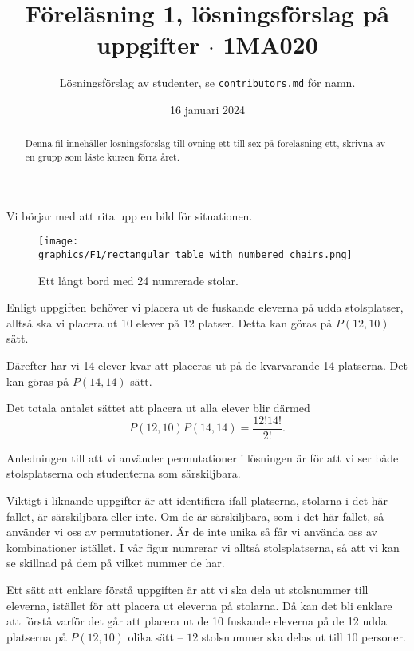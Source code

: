 \documentclass[nobib]{tufte-handout}
\title{Föreläsning 1, lösningsförslag på uppgifter $\cdot$ 1MA020}
\author[Studenter]{Lösningsförslag av studenter, se \nolinkurl{contributors.md} för namn.}
\date{16 januari 2024}
\begin{document}
\maketitle%

\begin{abstract}
\noindent
Denna fil innehåller lösningsförslag till övning ett till sex på föreläsning ett, skrivna av en grupp som läste kursen förra året.
\end{abstract}

\begin{solution}
	Vi börjar med att rita upp en bild för situationen.
	\begin{figure}
		\centering
		\texttt{[image: graphics/F1/rectangular\_table\_with\_numbered\_chairs.png]}
		\caption{Ett långt bord med 24 numrerade stolar.}
	\end{figure}

    Enligt uppgiften behöver vi placera ut de fuskande eleverna på udda stolsplatser, alltså ska vi placera ut 10 elever på 12 platser. Detta kan göras på $P(12,10)$ sätt.
	
	Därefter har vi 14 elever kvar att placeras ut på de kvarvarande 14 platserna. Det kan göras på $P(14,14)$ sätt. 
	
	Det totala antalet sättet att placera ut alla elever blir därmed
    $$P(12,10) P(14,14)=\frac{12! 14!}{2!}.$$

    Anledningen till att vi använder permutationer i lösningen är för att vi ser både stolsplatserna och studenterna som särskiljbara.

    \begin{tips}
		Viktigt i liknande uppgifter är att identifiera ifall platserna, stolarna i det här fallet, är särskiljbara eller inte. Om de är särskiljbara, som i det här fallet, så använder vi oss av permutationer. Är de inte unika så får vi använda oss av kombinationer istället. I vår figur numrerar vi alltså stolsplatserna, så att vi kan se skillnad på dem på vilket nummer de har.

    	Ett sätt att enklare förstå uppgiften är att vi ska dela ut stolsnummer till eleverna, istället för att placera ut eleverna på stolarna. Då kan det bli enklare att förstå varför det går att placera ut de 10 fuskande eleverna på de 12 udda platserna på $P(12,10)$ olika sätt -- $12$ stolsnummer ska delas ut till $10$ personer.
	\end{tips}
\end{solution}
\end{document}
